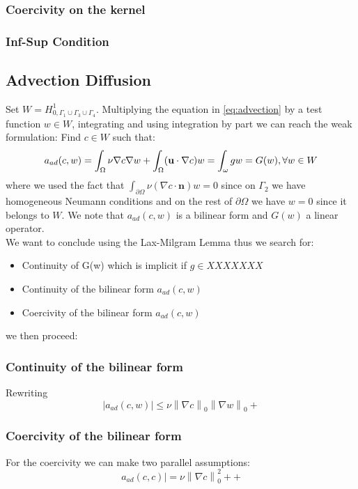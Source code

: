 \documentclass[conference]{IEEEtran}
\newcommand{\norm}[1]{\left\lVert#1\right\rVert}
\begin{document}
\subsubsection{Coercivity on the kernel}

\subsubsection{Inf-Sup Condition}




\subsection{Advection Diffusion}
Set $W= H^1_{0,\Gamma_1 \cup \Gamma_3 \cup \Gamma_4} $. Multiplying the equation in \ref{eq:advection} by a test function $w \in W$, integrating and using integration by part we can reach the weak formulation:
Find $c \in W$ such that:
\begin{equation}
      a_{ad}(c,w) = \int_\Omega \nu \nabla c \nabla w 
      + \int_\Omega (\textbf{u} \cdot \nabla c) w
      = \int_\omega gw = G(w),  \forall w \in W  \\
    \label{eq:advection_weak}
\end{equation}
where we used the fact that $\int_{\partial\Omega} \nu (\nabla c \cdot \textbf{n}) w = 0$ since on $\Gamma_2$ we have homogeneous Neumann conditions and on the rest of $\partial\Omega$ we have $w=0$ since it belongs to $W$. We note that $a_{ad}(c,w)$ is a bilinear form and $G(w)$ a linear operator.\\
We want to conclude using the Lax-Milgram Lemma thus we search for:
\begin{itemize}
\item Continuity of G(w) which is implicit if $g\in XXXXXXX$
\item Continuity of the bilinear form $a_{ad}(c,w)$
\item Coercivity of the bilinear form $a_{ad}(c,w)$
\end{itemize}
we then proceed:
\subsubsection{Continuity of the bilinear form} Rewriting
\begin{equation}
      |a_{ad}(c,w)| \leq \nu \norm{\nabla c}_0 \norm{\nabla w}_0
      +
\end{equation}

\subsubsection{Coercivity of the bilinear form}
For the coercivity we can make two parallel assumptions:
\begin{equation}
      a_{ad}(c,c)| = \nu \norm{\nabla c}_0^2 + 
      +
\end{equation}
\end{document}
